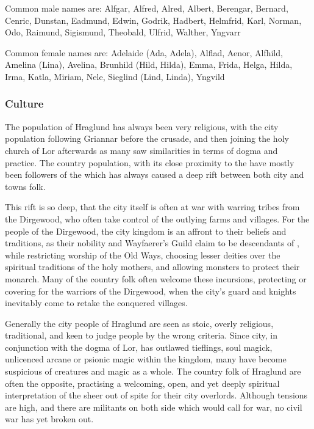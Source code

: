Common male names are: Alfgar, Alfred, Alred, Albert, Berengar, Bernard,
Cenric, Dunstan, Eadmund, Edwin, Godrik, Hadbert, Helmfrid, Karl, Norman,
Odo, Raimund, Sigismund, Theobald, Ulfrid, Walther, Yngvarr

Common female names are: Adelaide (Ada, Adela), Alflad, Aenor, Alfhild,
Amelina (Lina), Avelina, Brunhild (Hild, Hilda), Emma, Frida, Helga,
Hilda, Irma, Katla, Miriam, Nele, Sieglind (Lind, Linda), Yngvild

\subsubsection{Culture}

The population of Hraglund has always been very religious, with the city
population following Griannar before the crusade, and then joining the holy
church of Lor afterwards as many saw similarities in terms of dogma and
practice. The country population, with its close proximity to the
 have mostly been followers of the  which has always caused a deep rift between both city and towns folk.

This rift is so deep, that the city itself is often at war with warring tribes
from the Dirgewood, who often take control of the outlying farms and
villages. For the people of the Dirgewood, the city kingdom is an affront to
their beliefs and traditions, as their nobility and Wayfaerer's Guild claim to
be descendants of , while restricting worship of the Old
Ways, choosing lesser deities over the spiritual traditions of the holy
mothers, and allowing monsters to protect their monarch. Many of the country
folk often welcome these incursions, protecting or covering for the warriors
of the Dirgewood, when the city's guard and knights inevitably come to retake
the conquered villages.

Generally the city people of Hraglund are seen as stoic, overly religious,
traditional, and keen to judge people by the wrong criteria. Since city, in
conjunction with the dogma of Lor, has outlawed tieflings, soul magick,
unlicenced arcane or psionic magic within the kingdom, many have become
suspicious of creatures and magic as a whole. The country folk of Hraglund are
often the opposite, practising a welcoming, open, and yet deeply spiritual
interpretation of the  sheer out of spite for their city
overlords. Although tensions are high, and there are militants on both side
which would call for war, no civil war has yet broken out.

